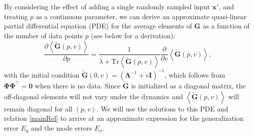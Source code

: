 \documentclass{article}
\begin{document}
By considering the effect of adding a single randomly sampled input $\mathbf{x'}$, and treating $p$ as a continuous parameter, we can derive an approximate quasi-linear partial differential equation (PDE) for the average elements of $\mathbf{G}$ as a function of the number of data points $p$ (see below for a derivation):
%
\begin{equation}\label{pde}
    \frac{\partial \left<\mathbf{\tilde{G}}(p,v)\right>}{\partial p}  =  \frac{1}{\lambda + \text{Tr} \left< \mathbf{\tilde{G}}(p,v) \right>} \frac{\partial}{\partial v} \left< \mathbf{\tilde{G}}(p,v) \right>,
\end{equation}
%
with the initial condition $\mathbf{\tilde{G}}(0,v) = (\mathbf{\Lambda}^{-1} + v \mathbf{I})^{-1}$, which follows from  $\mathbf{\Phi} \mathbf{\Phi}^\top = \bm{0}$ when there is no data.  
Since $\mathbf{\tilde{G}}$ is initialized as a diagonal matrix, the off-diagonal elements will not vary under the dynamics and $\left< \mathbf{\tilde{G}}(p,v) \right>$ will remain diagonal for all $(p,v)$. We will use the solutions to this PDE and relation \eqref{mainRel} to arrive at an approximate expression for the generalization error $E_g$ and the mode errors $E_\rho$.
\end{document}
